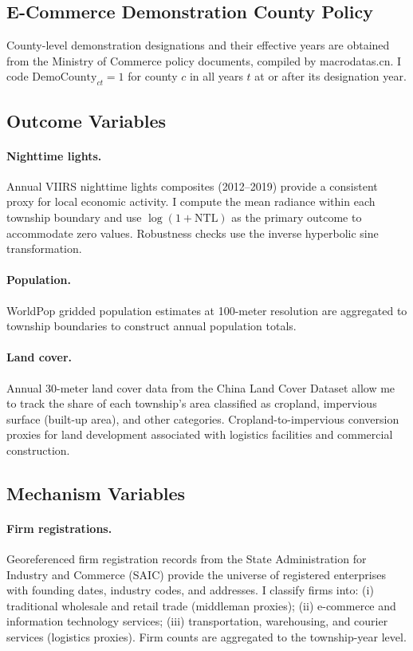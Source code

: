 \documentclass[12pt]{article}
\begin{document}
\subsection{E-Commerce Demonstration County Policy}

County-level demonstration designations and their effective years are obtained from the Ministry of Commerce policy documents, compiled by macrodatas.cn. I code $\text{DemoCounty}_{ct} = 1$ for county $c$ in all years $t$ at or after its designation year.

\subsection{Outcome Variables}

\paragraph{Nighttime lights.} Annual VIIRS nighttime lights composites (2012--2019) provide a consistent proxy for local economic activity. I compute the mean radiance within each township boundary and use $\log(1 + \text{NTL})$ as the primary outcome to accommodate zero values. Robustness checks use the inverse hyperbolic sine transformation.

\paragraph{Population.} WorldPop gridded population estimates at 100-meter resolution are aggregated to township boundaries to construct annual population totals.

\paragraph{Land cover.} Annual 30-meter land cover data from the China Land Cover Dataset allow me to track the share of each township's area classified as cropland, impervious surface (built-up area), and other categories. Cropland-to-impervious conversion proxies for land development associated with logistics facilities and commercial construction.

\subsection{Mechanism Variables}

\paragraph{Firm registrations.} Georeferenced firm registration records from the State Administration for Industry and Commerce (SAIC) provide the universe of registered enterprises with founding dates, industry codes, and addresses. I classify firms into: (i) traditional wholesale and retail trade (middleman proxies); (ii) e-commerce and information technology services; (iii) transportation, warehousing, and courier services (logistics proxies). Firm counts are aggregated to the township-year level.
\end{document}
